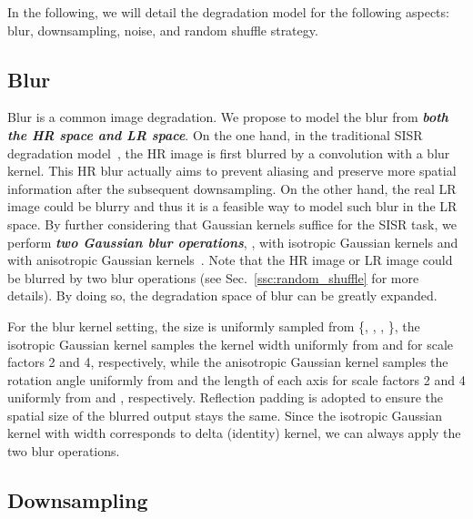 \documentclass[10pt,twocolumn,letterpaper]{article}
\begin{document}
In the following, we will detail the degradation model for the following aspects: blur, downsampling, noise, and random shuffle strategy.

\subsection{Blur}\label{section:blur}
Blur is a common image degradation. We propose to model the blur from \textbf{\emph{both the HR space and LR space}}. On the one hand, in the traditional SISR degradation model~\cite{liu2013bayesian,shocher2018zero}, the HR image is first blurred by a convolution with a blur kernel. This HR blur actually aims to prevent aliasing and preserve more spatial information after the subsequent downsampling. On the other hand, the real LR image could be blurry and thus it is a feasible way to model such blur in the LR space. By further considering that Gaussian kernels suffice for the SISR task, we perform \textbf{\emph{two Gaussian blur operations}}, \ie,  with isotropic Gaussian kernels and  with anisotropic Gaussian kernels~\cite{zhang2018learning,bell2019blind,riegler2015conditioned}. Note that the HR image or LR image could be blurred by two blur operations (see Sec.~\ref{ssc:random_shuffle} for more details). By doing so, the degradation space of blur can be greatly expanded.


For the blur kernel setting, the size is uniformly sampled from \{, , , \},
the isotropic Gaussian kernel samples the kernel width uniformly from  and  for scale factors 2 and 4, respectively, while the anisotropic Gaussian kernel samples the rotation angle uniformly from  and the length of each axis for scale factors 2 and 4 uniformly from  and , respectively.
Reflection padding is adopted to ensure the spatial size of the blurred output stays the same. Since the isotropic Gaussian kernel with width  corresponds to delta (identity) kernel, we can always apply the two blur operations.


\subsection{Downsampling}
\label{section:downsampling}
\end{document}
